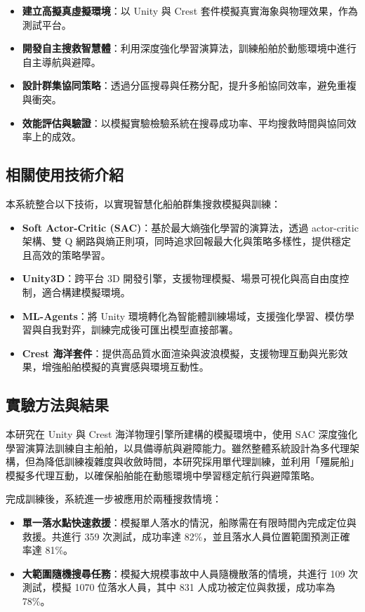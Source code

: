 \documentclass[12pt,a4paper]{article}
\begin{document}
\begin{itemize}
\item \textbf{建立高擬真虛擬環境}：以 Unity 與 Crest 套件模擬真實海象與物理效果，作為測試平台。
\item \textbf{開發自主搜救智慧體}：利用深度強化學習演算法，訓練船舶於動態環境中進行自主導航與避障。
\item \textbf{設計群集協同策略}：透過分區搜尋與任務分配，提升多船協同效率，避免重複與衝突。
\item \textbf{效能評估與驗證}：以模擬實驗檢驗系統在搜尋成功率、平均搜救時間與協同效率上的成效。
\end{itemize}

\subsection{相關使用技術介紹}

本系統整合以下技術，以實現智慧化船舶群集搜救模擬與訓練：

\begin{itemize}
	\item \textbf{Soft Actor-Critic (SAC)}：基於最大熵強化學習的演算法，透過 actor-critic 架構、雙 Q 網路與熵正則項，同時追求回報最大化與策略多樣性，提供穩定且高效的策略學習\cite{SAC}。
	\item \textbf{Unity3D}：跨平台 3D 開發引擎，支援物理模擬、場景可視化與高自由度控制，適合構建模擬環境。
	\item \textbf{ML-Agents}：將 Unity 環境轉化為智能體訓練場域，支援強化學習、模仿學習與自我對弈，訓練完成後可匯出模型直接部署\cite{MLAgentRepo}。
	 \item \textbf{Crest 海洋套件}：提供高品質水面渲染與波浪模擬，支援物理互動與光影效果，增強船舶模擬的真實感與環境互動性\cite{CrestIntro}。
\end{itemize}

\subsection{實驗方法與結果}
本研究在 Unity 與 Crest 海洋物理引擎所建構的模擬環境中，使用 SAC 深度強化學習演算法訓練自主船舶，以具備導航與避障能力。雖然整體系統設計為多代理架構，但為降低訓練複雜度與收斂時間，本研究採用單代理訓練，並利用「殭屍船」模擬多代理互動，以確保船舶能在動態環境中學習穩定航行與避障策略。

完成訓練後，系統進一步被應用於兩種搜救情境：  
\begin{itemize}
    \item \textbf{單一落水點快速救援}：模擬單人落水的情況，船隊需在有限時間內完成定位與救援。共進行 359 次測試，成功率達 82\%，並且落水人員位置範圍預測正確率達 81\%。  
    \item \textbf{大範圍隨機搜尋任務}：模擬大規模事故中人員隨機散落的情境，共進行 109 次測試，模擬 1070 位落水人員，其中 831 人成功被定位與救援，成功率為 78\%。  
\end{itemize}
\end{document}
